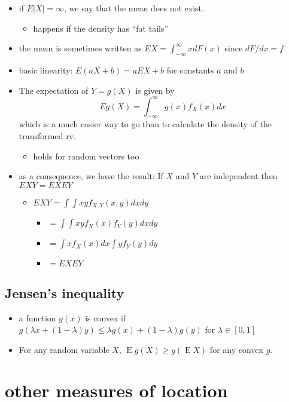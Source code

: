 \documentclass[11pt]{article}
\DeclareMathOperator{\E}{E}
\begin{document}
\begin{itemize}
\item if $E|X| = \infty$, we say that the mean does not exist.
\begin{itemize}
\item happens if the density has ``fat tails''
\end{itemize}
\item the mean is sometimes written as $EX = \int_{-\infty}^{\infty} x
       dF(x)$ since $dF/dx = f$
\item basic linearity: $E(a X + b) = a E X + b$ for constants $a$
       and $b$
\item The expectation of $Y = g(X)$ is given by \[ E g(X) =
       \int_{-\infty}^\infty g(x) f_X(x) dx \] which is a much
       easier way to go than to calculate the density
       of the transformed rv.
\begin{itemize}
\item holds for random vectors too
\end{itemize}
\item as a consequence, we have the result: If $X$ and $Y$ are
       independent then $E XY = EX E Y$
\begin{itemize}
\item $EXY = \int\int x y f_{X,Y}(x,y) dx dy$
\begin{itemize}
\item $= \int\int xy f_X(x) f_Y(y) dx dy$
\item $= \int x f_X(x) dx \int y f_Y(y) dy$
\item $= EX EY$
\end{itemize}
\end{itemize}
\end{itemize}
\subsection{Jensen's inequality}
\label{sec-1-5}

\begin{itemize}
\item a function $g(x)$ is convex if $g(\lambda x + (1-\lambda)y)
       \leq \lambda g(x) + (1-\lambda) g(y)$ for $\lambda \in [0,1]$
\item For any random variable $X$, $\E g(X) \geq g(\E X)$ for any
       convex $g$.
\end{itemize}
\section{other measures of location}
\label{sec-2}
\end{document}
